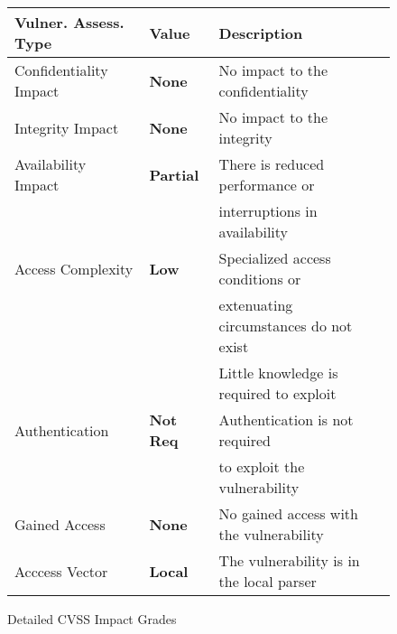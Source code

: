 \begin{figure}
\begin{minipage}{0.5\textwidth}
       \begin{flushleft}
  \tabcolsep 3pt
  \scriptsize
  \begin{tabular}{lll}
   Vulner. Assess. Type   & Value & Description \\
      \hline
    Confidentiality Impact & {\bf None}  & No impact to the confidentiality \\
    Integrity Impact & {\bf None}  & No impact to the integrity \\
    Availability Impact & {\bf Partial} & There is reduced performance or\\
    & & interruptions in availability\\
    Access Complexity & {\bf Low} & Specialized access conditions or \\
    & & extenuating circumstances do not exist\\
    & & Little knowledge is required to exploit\\
    Authentication & {\bf Not Req} & Authentication is not required \\
    & & to exploit the vulnerability\\
    Gained Access & {\bf None}  & No gained access with the vulnerability \\
    Acccess Vector & {\bf Local} & The vulnerability is in the local parser \\
  \end{tabular}%
  \end{flushleft}
    \caption{Detailed CVSS Impact Grades}
         \label{cvss}
     \end{minipage}
\end{figure}

        

